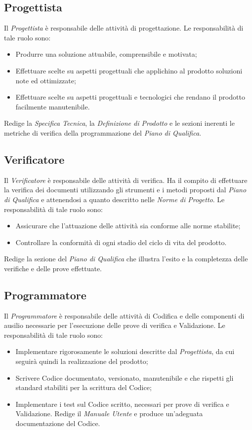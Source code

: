 \subsection{Progettista}
Il \textit{Progettista} è responsabile delle attività di progettazione. Le responsabilità di tale ruolo sono:
\begin{itemize}
\item Produrre una soluzione attuabile, comprensibile e motivata;
\item Effettuare scelte su aspetti progettuali che applichino al prodotto soluzioni note
ed ottimizzate;
\item Effettuare scelte su aspetti progettuali e tecnologici che rendano il prodotto facilmente manutenibile.
\end{itemize}
Redige la \textit{Specifica Tecnica}, la \textit{Definizione di Prodotto} e le sezioni inerenti le metriche di verifica della programmazione del \textit{Piano di Qualifica}.

\subsection{Verificatore}
Il \textit{Verificatore} è responsabile delle attività di verifica. Ha il compito di effettuare la verifica dei documenti utilizzando gli strumenti e i metodi proposti dal \textit{Piano di Qualifica}
e attenendosi a quanto descritto nelle \textit{Norme di Progetto}. Le responsabilità di tale ruolo sono:
\begin{itemize}

\item Assicurare che l'attuazione delle attività sia conforme alle norme stabilite;
\item Controllare la conformità di ogni stadio del ciclo di vita del prodotto.
\end{itemize}
Redige la sezione del \textit{Piano di Qualifica} che illustra l'esito e la completezza delle verifiche e delle prove effettuate.

\subsection{Programmatore}
Il \textit{Programmatore} è responsabile delle attività di Codifica e delle componenti di ausilio necessarie per l'esecuzione delle prove di verifica e Validazione. Le responsabilità di tale
ruolo sono:
\begin{itemize}
\item Implementare rigorosamente le soluzioni descritte dal \textit{Progettista}, da cui seguirà quindi la realizzazione del prodotto;
\item Scrivere Codice documentato, versionato, manutenibile e che rispetti gli standard stabiliti per la scrittura del Codice;
\item Implementare i test sul Codice scritto, necessari per prove di verifica e Validazione.
Redige il \textit{Manuale Utente} e produce un'adeguata documentazione del Codice.
\end{itemize}